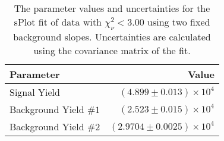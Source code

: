 
\begin{table}[h]
    \begin{center}
        \begin{tabular}{lr}\toprule
            Parameter & Value \\\midrule
            Signal Yield & $(4.899 \pm 0.013) \times 10^{4}$ \\
            Background Yield $\#1$ & $(2.523 \pm 0.015) \times 10^{4}$ \\
            Background Yield $\#2$ & $(2.9704 \pm 0.0025) \times 10^{4}$ \\\bottomrule
        \end{tabular}
        \caption{The parameter values and uncertainties for the sPlot fit of data with $\chi^2_\nu < 3.00$ using two fixed background slopes. Uncertainties are calculated using the covariance matrix of the fit.}
    \end{center}
\end{table}
